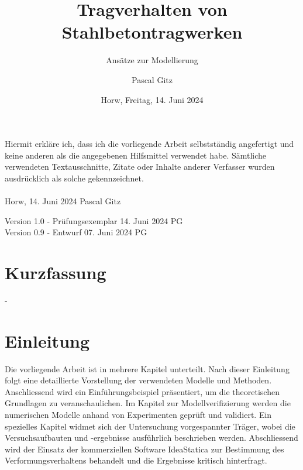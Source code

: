\documentclass[
  11pt,
  letterpaper,
]{scrreprt}
\title{Tragverhalten von Stahlbetontragwerken}
\subtitle
{Ansätze zur Modellierung}
\date{\large Horw, Freitag, 14. Juni 2024}
\author{Pascal Gitz}
\renewcommand*\contentsname{Inhaltsverzeichnis}
\newcommand\contentsname{Inhaltsverzeichnis}
\begin{document}
\maketitle


Hiermit erkläre ich, dass ich die vorliegende Arbeit selbstständig angefertigt und keine anderen als die angegebenen Hilfsmittel verwendet habe. Sämtliche verwendeten Textausschnitte, Zitate oder Inhalte anderer Verfasser wurden ausdrücklich als solche gekennzeichnet.\\%
%
\\%
%
Horw, 14. Juni 2024 \hfill Pascal Gitz%

\vfill

Version 1.0 - Prüfungsexemplar \hfill 14. Juni 2024 \quad \quad \quad \quad \quad PG\\
Version 0.9 - Entwurf \hfill 07. Juni 2024 \quad \quad \quad \quad \quad PG\\

\newpage

\chapter*{Kurzfassung}

-

\renewcommand*\contentsname{Inhaltsverzeichnis}
{
\hypersetup{linkcolor=}
\setcounter{tocdepth}{1}
\tableofcontents
}
\listoffigures
\listoftables
{}

\chapter{Einleitung}\label{einleitung}

Die vorliegende Arbeit ist in mehrere Kapitel unterteilt. Nach dieser
Einleitung folgt eine detaillierte Vorstellung der verwendeten Modelle
und Methoden. Anschliessend wird ein Einführungsbeispiel präsentiert, um
die theoretischen Grundlagen zu veranschaulichen. Im Kapitel zur
Modellverifizierung werden die numerischen Modelle anhand von
Experimenten geprüft und validiert. Ein spezielles Kapitel widmet sich
der Untersuchung vorgespannter Träger, wobei die Versuchsaufbauten und
-ergebnisse ausführlich beschrieben werden. Abschliessend wird der
Einsatz der kommerziellen Software IdeaStatica zur Bestimmung des
Verformungsverhaltens behandelt und die Ergebnisse kritisch hinterfragt.
\end{document}
